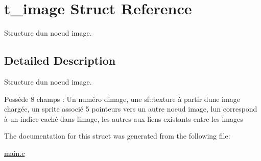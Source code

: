 \hypertarget{structt__image}{}\section{t\+\_\+image Struct Reference}
\label{structt__image}


Structure d\textquotesingle{}un noeud image.  




\subsection{Detailed Description}
Structure d\textquotesingle{}un noeud image. 

Possède 8 champs \+: Un numéro d\textquotesingle{}image, une sf\+::texture à partir d\textquotesingle{}une image chargée, un sprite associé 5 pointeurs vers un autre noeud image, l\textquotesingle{}un correspond à un indice caché dans l\textquotesingle{}image, les autres aux liens existants entre les images 

The documentation for this struct was generated from the following file\+:\begin{DoxyCompactItemize}
\item 
\hyperlink{main_8c}{main.\+c}\end{DoxyCompactItemize}
